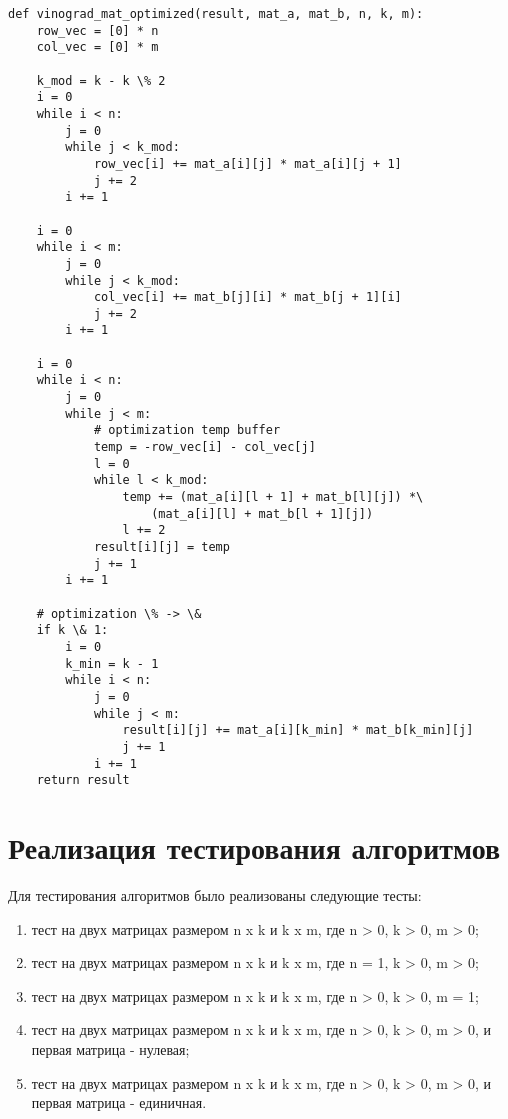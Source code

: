 \begin{lstlisting}[label=some-code-3,caption=Оптимизированный алгоритм Винограда для умножения матриц]
def vinograd_mat_optimized(result, mat_a, mat_b, n, k, m):
    row_vec = [0] * n
    col_vec = [0] * m
    
    k_mod = k - k \% 2
    i = 0
    while i < n:
        j = 0
        while j < k_mod:
            row_vec[i] += mat_a[i][j] * mat_a[i][j + 1]
            j += 2
        i += 1

    i = 0
    while i < m:
        j = 0
        while j < k_mod:
            col_vec[i] += mat_b[j][i] * mat_b[j + 1][i]
            j += 2
        i += 1

    i = 0
    while i < n:
        j = 0
        while j < m:
            # optimization temp buffer
            temp = -row_vec[i] - col_vec[j]
            l = 0
            while l < k_mod:
                temp += (mat_a[i][l + 1] + mat_b[l][j]) *\
                    (mat_a[i][l] + mat_b[l + 1][j])
                l += 2
            result[i][j] = temp
            j += 1
        i += 1
    
    # optimization \% -> \&
    if k \& 1:
        i = 0
        k_min = k - 1
        while i < n:
            j = 0
            while j < m:
                result[i][j] += mat_a[i][k_min] * mat_b[k_min][j]
                j += 1
            i += 1
    return result
\end{lstlisting}

\section{Реализация тестирования алгоритмов}

Для тестирования алгоритмов было реализованы следующие тесты:
\begin{enumerate}
	\item тест на двух матрицах размером n x k и k x m, где n > 0, k >  0, m > 0;
	\item тест на двух матрицах размером n x k и k x m, где n = 1, k >  0, m > 0;
	\item тест на двух матрицах размером n x k и k x m, где n > 0, k >  0, m = 1;
	\item тест на двух матрицах размером n x k и k x m, где n > 0, k >  0, m > 0, и первая матрица - нулевая;
	\item тест на двух матрицах размером n x k и k x m, где n > 0, k >  0, m > 0, и первая матрица - единичная.
\end{enumerate}

